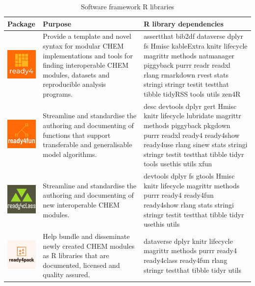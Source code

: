 \documentclass[
]{article}
\begin{document}
\begin{table}

\caption{\label{tab:cpkgs}Software framework R libraries}
\centering
\begin{tabular}[t]{l>{\raggedright\arraybackslash}m{20em}>{\raggedright\arraybackslash}m{20em}}
\toprule
Package & Purpose & R library dependencies\\
\midrule
\includegraphics[valign=M,width=1.9cm,raise=4mm]{ready4_logo.png} & Provide a template and novel syntax for modular CHEM implementations and tools for finding interoperable CHEM modules, datasets and reproducible analysis programs. & assertthat bib2df dataverse dplyr fs Hmisc kableExtra knitr lifecycle magrittr methods natmanager piggyback purrr readr readxl rlang rmarkdown rvest stats stringi stringr testit testthat tibble tidyRSS tools utils zen4R\\
\includegraphics[valign=M,width=1.9cm,raise=4mm]{ready4fun_logo.png} & Streamline and standardise the authoring and documenting of functions that support transferable and generalisable model algorithms. & desc devtools dplyr gert Hmisc knitr lifecycle lubridate magrittr methods piggyback pkgdown purrr readxl ready4 ready4show ready4use rlang sinew stats stringi stringr testit testthat tibble tidyr tools usethis utils xfun\\
\includegraphics[valign=M,width=1.9cm,raise=4mm]{ready4class_logo.png} & Streamline and standardise the authoring and documenting of new interoperable CHEM modules. & devtools dplyr fs gtools Hmisc knitr lifecycle magrittr methods purrr ready4 ready4fun ready4show rlang stats stringi stringr testit testthat tibble tidyr usethis utils\\
\includegraphics[valign=M,width=1.9cm,raise=4mm]{ready4pack_logo.png} & Help bundle and disseminate newly created CHEM modules as R libraries that are documented, licensed and quality assured. & dataverse dplyr knitr lifecycle magrittr methods purrr ready4 ready4class ready4fun rlang stringr testthat tibble tidyr utils\\

\end{tabular}
\end{table}
\end{document}
